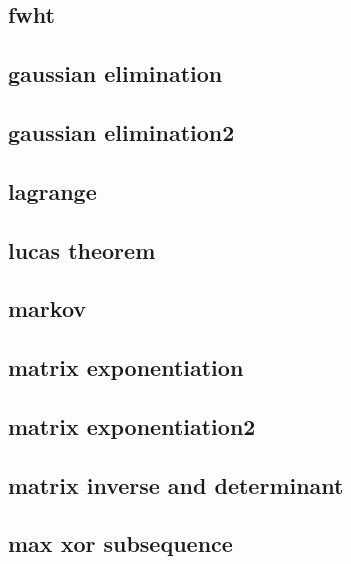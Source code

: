 \subsection{fwht}
\raggedbottom
\hrulefill
\subsection{gaussian elimination}
\raggedbottom
\hrulefill
\subsection{gaussian elimination2}
\raggedbottom
\hrulefill
\subsection{lagrange}
\raggedbottom
\hrulefill
\subsection{lucas theorem}
\raggedbottom
\hrulefill
\subsection{markov}
\raggedbottom
\hrulefill
\subsection{matrix exponentiation}
\raggedbottom
\hrulefill
\subsection{matrix exponentiation2}
\raggedbottom
\hrulefill
\subsection{matrix inverse and determinant}
\raggedbottom
\hrulefill
\subsection{max xor subsequence}
\raggedbottom
\hrulefill
